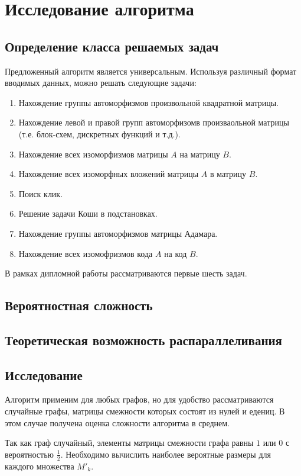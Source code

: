 \section{Исследование алгоритма}
\label{sec:AlgoResearch_4} 
\large


\subsection{Определение класса решаемых задач}
Предложенный алгоритм является универсальным. Используя различный формат вводимых данных, можно решать следующие задачи:
\begin{enumerate}
\item Нахождение группы автоморфизмов произвольной квадратной матрицы.
\item Нахождение левой и правой групп автоморфизомв произваольной матрицы (т.е. блок-схем, дискретных функций и т.д.).
\item Нахождение всех изоморфизмов матрицы $A$ на матрицу $B$.
\item Нахождение всех изоморфных вложений матрицы $A$ в матрицу $B$.
\item Поиск клик.
\item Решение задачи Коши в подстановках.
\item Нахождение группы автоморфизмов матрицы Адамара.
\item Нахождение всех изомофризмов кода $A$ на код $B$.
\end{enumerate}

В рамках дипломной работы рассматриваются первые шесть задач.
\subsection{Вероятностная сложность}
\subsection{Теоретическая возможность распараллеливания}

\subsection{Исследование}
Алгоритм применим для любых графов, но для удобство рассматриваются случайные графы, матрицы смежности которых состоят из нулей и едениц.
В этом случае получена оценка сложности алгоритма в среднем.

Так как граф случайный, элементы матрицы смежности графа равны $1$ или $0$ с вероятностью $\frac{1}{2}$. Необходимо вычислить наиболее вероятные размеры для каждого множества $M'_k$.

